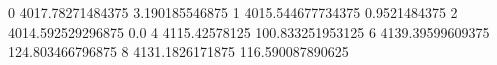 0 4017.78271484375 3.190185546875
1 4015.544677734375 0.9521484375
2 4014.592529296875 0.0
4 4115.42578125 100.833251953125
6 4139.39599609375 124.803466796875
8 4131.1826171875 116.590087890625
